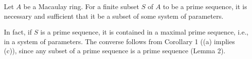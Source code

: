 Let $A$ be a Macaulay ring. For a finite subset $S$ of $A$ to be a prime sequence, it is necessary and sufficient that it be a subset of some system of parameters.

In fact, if $S$ is a prime sequence, it is contained in a maximal prime sequence, i.e., in a system of parameters. The converse follows from Corollary 1 ((a) implies (c)), since any subset of a prime sequence is a prime sequence (Lemma 2).